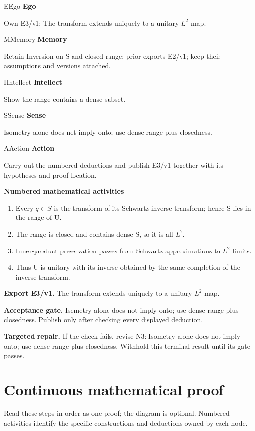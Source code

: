 \documentclass[preprint,12pt,aps,pra,showkeys,amsmath,amssymb,superscriptaddress,floatfix]{revtex4-2}
\theoremstyle{definition}
\theoremstyle{remark}
\newcommand{\mmfaculty}[3]{%
 \begin{mmfacultybox}{#1}{#2}
 {\sffamily\bfseries\color{MMBlue}#2}\par\smallskip #3
 \end{mmfacultybox}}
\newcommand{\field}[2]{\par\smallskip\noindent\textbf{#1.} #2\par}
\begin{document}
\mmfaculty{E}{Ego}{Own E3/v1: The transform extends uniquely to a unitary \(L^{2}\) map.}

\mmfaculty{M}{Memory}{Retain Inversion on S and closed range; prior exports E2/v1; keep their
assumptions and versions attached.}

\mmfaculty{I}{Intellect}{Show the range contains a dense subset.}

\mmfaculty{S}{Sense}{Isometry alone does not imply onto; use dense range plus closedness.}

\mmfaculty{A}{Action}{Carry out the numbered deductions and publish E3/v1 together with its
hypotheses and proof location.}

\smallskip\noindent\textbf{Numbered mathematical activities}

\begin{enumerate}[label=N3.\arabic*,leftmargin=3.4em]

\item Every \(g\in S\) is the transform of its Schwartz inverse transform;
hence S lies in the range of U.

\item The range is closed and contains dense S, so it is all \(L^{2}\).

\item Inner-product preservation passes from Schwartz approximations to
\(L^{2}\) limits.

\item Thus U is unitary with its inverse obtained by the same completion of
the inverse transform.

\end{enumerate}

\field{Export E3/v1}{The transform extends uniquely to a unitary \(L^{2}\) map.}

\field{Acceptance gate}{Isometry alone does not imply onto; use dense range plus closedness.
Publish only after checking every displayed deduction.}

\field{Targeted repair}{If the check fails, revise N3: Isometry alone does not imply onto; use
dense range plus closedness. Withhold this terminal result until its
gate passes.}

\endgroup\clearpage\section{Continuous mathematical proof}\label{sec:proof}

Read these steps in order as one proof; the diagram is optional.
Numbered activities identify the specific constructions and deductions
owned by each node.
\end{document}
